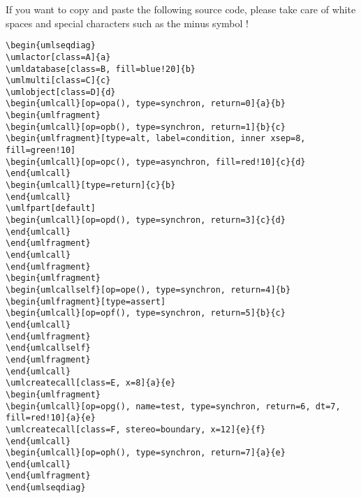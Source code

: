 \documentclass[a4paper,11pt, svgnames]{article}
\date{}
\title{}
\author{}
\begin{document}
\maketitle

If you want to copy and paste the following source code, please take care of white spaces and special characters such as the minus symbol !

\medskip
\lstset{breaklines=true, frame=trBL, language=tikzuml}
\begin{lstlisting}
\begin{umlseqdiag}
\umlactor[class=A]{a}
\umldatabase[class=B, fill=blue!20]{b}
\umlmulti[class=C]{c}
\umlobject[class=D]{d}
\begin{umlcall}[op=opa(), type=synchron, return=0]{a}{b}
\begin{umlfragment}
\begin{umlcall}[op=opb(), type=synchron, return=1]{b}{c}
\begin{umlfragment}[type=alt, label=condition, inner xsep=8, fill=green!10]
\begin{umlcall}[op=opc(), type=asynchron, fill=red!10]{c}{d}
\end{umlcall}
\begin{umlcall}[type=return]{c}{b}
\end{umlcall}
\umlfpart[default]
\begin{umlcall}[op=opd(), type=synchron, return=3]{c}{d}
\end{umlcall}
\end{umlfragment}
\end{umlcall}
\end{umlfragment}
\begin{umlfragment}
\begin{umlcallself}[op=ope(), type=synchron, return=4]{b}
\begin{umlfragment}[type=assert]
\begin{umlcall}[op=opf(), type=synchron, return=5]{b}{c}
\end{umlcall}
\end{umlfragment}
\end{umlcallself}
\end{umlfragment}
\end{umlcall}
\umlcreatecall[class=E, x=8]{a}{e}
\begin{umlfragment}
\begin{umlcall}[op=opg(), name=test, type=synchron, return=6, dt=7, fill=red!10]{a}{e}
\umlcreatecall[class=F, stereo=boundary, x=12]{e}{f}
\end{umlcall}
\begin{umlcall}[op=oph(), type=synchron, return=7]{a}{e}
\end{umlcall}
\end{umlfragment}
\end{umlseqdiag}
\end{lstlisting}
\end{document}

